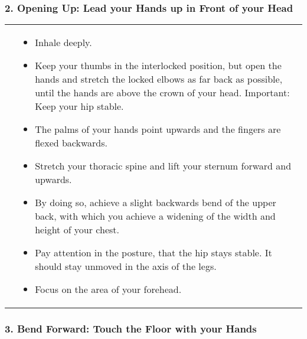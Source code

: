 \documentclass[../Book.Stress_regulation.tex]{subfiles}
\begin{document}
\subsubsection{2. Opening Up: Lead your Hands up in Front of your Head}

\begin{tabular}{p{1.3cm} p{10.2cm}}
     \raisebox{-1.2\totalheight}{\texttt{[image: SS\_Opening]}}
& 
\begin{itemize}
\item Inhale deeply.
\item Keep your thumbs in the interlocked position, but open the hands and stretch the locked elbows as far back as possible, until the hands are above the crown of your head. Important: Keep your hip stable.
\item The palms of your hands point upwards and the fingers are flexed backwards.
\item Stretch your thoracic spine and lift your sternum forward and upwards.
\item By doing so, achieve a slight backwards bend of the upper back, with which you achieve a widening of the width and height of your chest.
\item Pay attention in the posture, that the hip stays stable. It should stay unmoved in the axis of the legs.
\item Focus on the area of your forehead.
\end{itemize}  
\end{tabular}
\newpage

\subsubsection{3. Bend Forward: Touch the Floor with your Hands}
\end{document}
